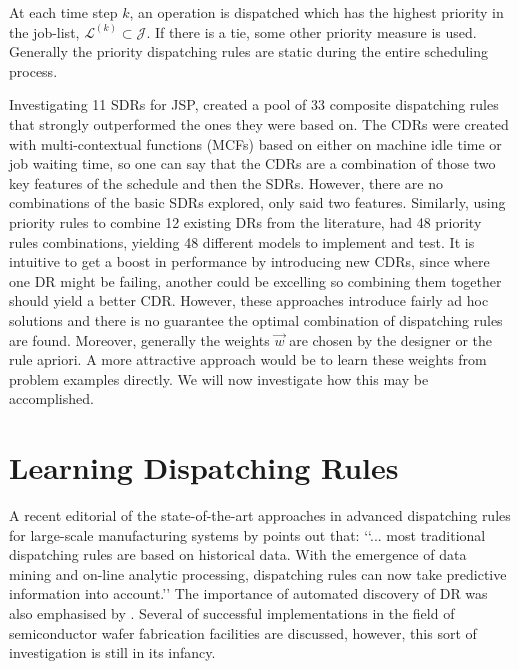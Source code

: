 \documentclass[smallextended]{svjour3}
\begin{document}

At each time step $k$, an operation is dispatched which has the highest 
priority in the job-list, $\mathcal{L}^{(k)}\subset\mathcal{J}$.  If there is a 
tie, some other priority measure is used. Generally the priority dispatching 
rules are static during the entire scheduling process.

Investigating 11 SDRs for JSP, \cite{Lu13} created a pool of 33 composite 
dispatching rules that strongly outperformed the ones they were based on. 
The CDRs were created with multi-contextual functions (MCFs) 
based on either on machine idle time or job waiting time, so one can say that 
the CDRs are a combination of those two key features of the schedule and then 
the SDRs. However, there are no combinations of the basic SDRs explored, only 
said two features.  
Similarly, using priority rules to combine 12 existing DRs from the literature, 
\citet{Yu13} had 48 priority rules combinations, yielding 48 different models 
to implement and test. 
It is intuitive to get a boost in performance by introducing new CDRs, since 
where one DR might be failing, another could be excelling so combining them 
together should yield a better CDR. However, these approaches introduce fairly 
ad hoc solutions and there is no guarantee the optimal combination of 
dispatching rules are found.
Moreover, generally the weights $\vec{w}$ are chosen by the designer or the 
rule apriori.  A more attractive approach would be to learn these weights from 
problem examples directly. We will now investigate how this may be accomplished.

\section{Learning Dispatching Rules}\label{ch:learningmodels}
A recent editorial of the state-of-the-art approaches in advanced dispatching 
rules for large-scale manufacturing systems by \citet{Chen13} points out that:
\lq\lq ... most traditional dispatching rules are based on historical data. 
With the emergence of data mining and on-line analytic processing, dispatching 
rules can now take predictive information into account.\rq\rq 
The importance of automated discovery of DR was also emphasised by 
\cite{Monch13}. 
Several of successful implementations in the field of semiconductor wafer 
fabrication facilities are discussed, however, this sort of investigation is 
still in its infancy.
\end{document}
